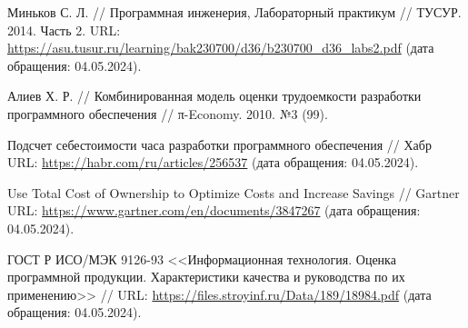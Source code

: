 \begin{thebibliography}{99\kern\bibindent}
	 Миньков С. Л. // Программная инженерия, Лабораторный практикум // ТУСУР. 2014. Часть 2. URL: \url{https://asu.tusur.ru/learning/bak230700/d36/b230700_d36_labs2.pdf} (дата обращения: 04.05.2024).

	 Алиев Х. Р. // Комбинированная модель оценки трудоемкости разработки программного обеспечения // π-Economy. 2010. №3 (99). %

	 Подсчет себестоимости часа разработки программного обеспечения // Хабр URL: \url{https://habr.com/ru/articles/256537} (дата обращения: 04.05.2024).

	 Use Total Cost of Ownership to Optimize Costs and Increase Savings // Gartner URL: \url{https://www.gartner.com/en/documents/3847267} (дата обращения: 04.05.2024).

	 ГОСТ Р ИСО/МЭК 9126-93 <<Информационная технология. Оценка программной продукции. Характеристики качества и руководства по их применению>> // URL: \url{https://files.stroyinf.ru/Data/189/18984.pdf} (дата обращения: 04.05.2024).

\end{thebibliography}